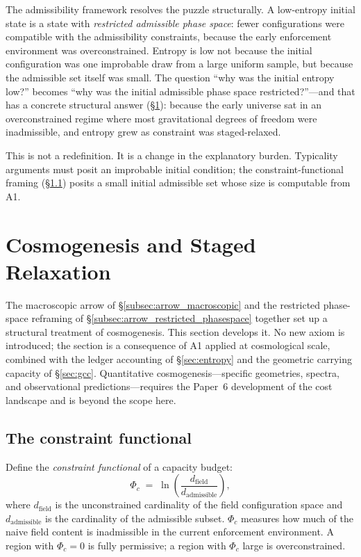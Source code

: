 \documentclass[11pt]{article}
\begin{document}
The admissibility framework resolves the puzzle structurally.  A
low-entropy initial state is a state with \emph{restricted admissible
phase space}: fewer configurations were compatible with the admissibility
constraints, because the early enforcement environment was overconstrained.
Entropy is low not because the initial configuration was one improbable
draw from a large uniform sample, but because the admissible set itself
was small.  The question ``why was the initial entropy low?'' becomes
``why was the initial admissible phase space restricted?''---and that has
a concrete structural answer (\S\ref{sec:cosmogenesis}): because the early
universe sat in an overconstrained regime where most gravitational degrees
of freedom were inadmissible, and entropy grew as constraint was
staged-relaxed.

This is not a redefinition.  It is a change in the explanatory burden.
Typicality arguments must posit an improbable initial condition; the
constraint-functional framing (\S\ref{subsec:cos_Phi_c}) posits a small
initial admissible set whose size is computable from A1.


\section{Cosmogenesis and Staged Relaxation}
\label{sec:cosmogenesis}

The macroscopic arrow of \S\ref{subsec:arrow_macroscopic} and the restricted
phase-space reframing of \S\ref{subsec:arrow_restricted_phasespace}
together set up a structural treatment of cosmogenesis.  This section
develops it.  No new axiom is introduced; the section is a consequence of
A1 applied at cosmological scale, combined with the ledger accounting of
\S\ref{sec:entropy} and the geometric carrying capacity of
\S\ref{sec:gcc}.  Quantitative cosmogenesis---specific geometries,
spectra, and observational predictions---requires the Paper~6 development
of the cost landscape and is beyond the scope here.

\subsection{The constraint functional}
\label{subsec:cos_Phi_c}

Define the \emph{constraint functional} of a capacity budget:
\[
  \Phi_c \;=\; \ln\!\left(\frac{d_{\mathrm{field}}}{d_{\mathrm{admissible}}}\right),
\]
where $d_{\mathrm{field}}$ is the unconstrained cardinality of the field
configuration space and $d_{\mathrm{admissible}}$ is the cardinality of the
admissible subset.  $\Phi_c$ measures how much of the naive field content
is inadmissible in the current enforcement environment.  A region with
$\Phi_c = 0$ is fully permissive; a region with $\Phi_c$ large is
overconstrained.
\end{document}
